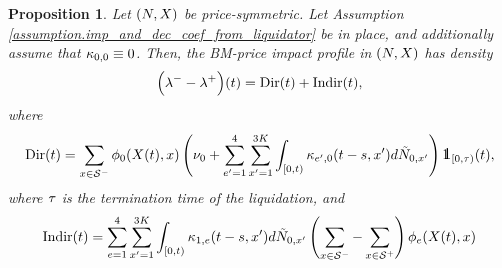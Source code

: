 \documentclass[10pt, article,table]{article}
\newtheorem{prop}[thm]{Proposition}
\begin{document}
\begin{prop}\label{prop.bm_impact}
 Let $(N,X)$ be price-symmetric. Let Assumption \ref{assumption.imp_and_dec_coef_from_liquidator} be in place, and additionally assume that $\kappa_{0,0} \equiv 0$. Then, the BM-price impact profile in $(N,X)$ has density
 \begin{equation}\label{eq.intensity_of_BM-impact}
 \Big(\lambda_{}^{-} - \lambda_{}^{+}\Big)(t)
  =\text{Dir}(t) + \text{Indir}(t),
  \end{equation}
  where 
  \begin{equation*}
   \directImpact(t)=  
  \sum_{x\in\deflationarySpace}\transProb_{0} (\stateVariable(t),x)
  \left(\baseRate_{0}  
  + \sum_{\eone=1}^{4}\sum_{\xone=1}^{3K} \int_{[0,t)} \hawkesKernel_{\eone,0}(t-s,\xone)d\hybridHawkes_{0,\xone}
  \right)
  \one_{[0,\terminationTime)} (t),
  \end{equation*}
 where $\tau$ is the termination time of the liquidation, and
 \begin{equation*}
  \text{Indir}(t)=
  \sum_{e=1}^{4}\sum_{x^{\prime}=1}^{3K} \int_{[0,t)} \kappa_{1,e}(t-s,x^{\prime})d\tilde{N}_{0,x^{\prime}}
  \left(
  \sum_{x\in\mathcal{S}^{-}}
  -
  \sum_{x\in\mathcal{S}^{+}}
  \right) \phi_{e}(X(t),x)
 \end{equation*}
\end{prop}
\end{document}
